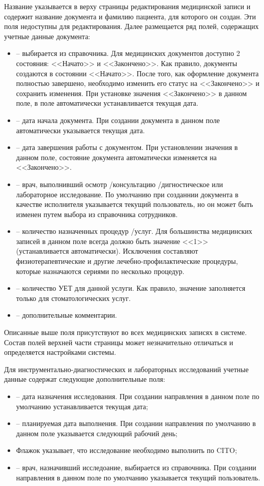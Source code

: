 {Название указывается в верху страницы редактирования медицинской записи и содержит название документа и фамилию пациента, для которого он создан. Эти поля недоступны для редактирования. Далее размещается ряд полей, содержащих учетные данные документа: 
\begin{itemize}
 \item {} -- выбирается из справочника. Для медицинских документов доступно 2 состояния: <<Начато>> и <<Закончено>>. Как правило, документы создаются в состоянии <<Начато>>. После того, как оформление документа полностью завершено, необходимо изменить его статус на <<Закончено>> и сохранить изменения. При установке значения <<Закончено>> в данном поле, в поле  автоматически устанавливается текущая дата. 
 \item {} -- дата начала документа. При создании документа в данном поле автоматически указывается текущая дата.
 \item {} -- дата завершения работы с документом. При установлении значения в данном поле, состояние документа автоматически изменяется на <<Закончено>>. 
 \item {} -- врач, выполнивший осмотр \slash консультацию \slash дигностическое или лабораторное исследование. По умолчанию при созданнии документа в качестве исполнителя указывается текущий пользователь, но он может быть изменен путем выбора из справочника сотрудников. 
 \item {} -- количество назначенных процедур \slash услуг. Для большинства медицинских записей в данном поле всегда должно быть значение <<1>> (устанавливается автоматически). Исключения составляют физиотерапевтические и другие лечебно-профилактические процедуры, которые назначаются сериями по несколько процедур. 
 \item {} -- количество УЕТ для данной услуги. Как правило, значение заполняется только для стоматологических услуг.
 \item {} -- дополнительные комментарии.
\end{itemize}

Описанные выше поля присутствуют во всех медицинских записях в системе. Состав полей верхней части страницы может незначительно отличаться и определяется настройками системы.

Для инструментально-диагностических и лабораторных исследований учетные данные содержат следующие дополнительные поля: 
\begin{itemize}
 \item {} -- дата назначения исследования. При создании направления в данном поле по умолчанию устанавливается текущая дата;
 \item {} -- планируемая дата выполнения. При создании направления по умолчанию в данном поле указывается следующий рабочий день;
 \item Флажок  указывает, что исследование необходимо выполнить по CITO;
 \item {} -- врач, назначивший исследоание, выбирается из справочника. При создании направления в данном поле по умолчанию указывается текущий пользователь.  
\end{itemize}

}
